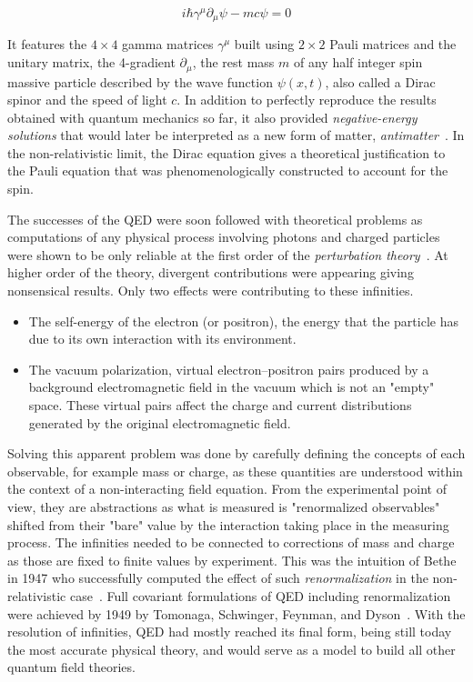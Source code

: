 	\begin{equation}
		\label{eq:dirac}
		i\hbar \gamma^\mu\partial_\mu\psi - mc\psi = 0
	\end{equation}
	
	It features the $4 \times 4$ gamma matrices $\gamma^\mu$ built using $2 \times 2$ Pauli matrices and the unitary matrix, the 4-gradient $\partial_\mu$, the rest mass $m$ of any half integer spin massive particle described by the wave function $\psi(x,t)$, also called a Dirac spinor and the speed of light $c$. In addition to perfectly reproduce the results obtained with quantum mechanics so far, it also provided \textit{negative-energy solutions} that would later be interpreted as a new form of matter, \textit{antimatter}~\cite{OPPENHEIMER1930I,DIRAC1931}. In the non-relativistic limit, the Dirac equation gives a theoretical justification to the Pauli equation that was phenomenologically constructed to account for the spin.
	
	The successes of the QED were soon followed with theoretical problems as computations of any physical process involving photons and charged particles were shown to be only reliable at the first order of the \textit{perturbation theory}~\cite{OPPENHEIMER1930II}. At higher order of the theory, divergent contributions were appearing giving nonsensical results. Only two effects were contributing to these infinities.
	
	\begin{itemize}
		\item The self-energy of the electron (or positron), the energy that the particle has due to its own interaction with its environment.
		\item The vacuum polarization, virtual electron–positron pairs produced by a background electromagnetic field in the vacuum which is not an "empty" space. These virtual pairs affect the charge and current distributions generated by the original electromagnetic field.
	\end{itemize}
	
	Solving this apparent problem was done by carefully defining the concepts of each observable, for example mass or charge, as these quantities are understood within the context of a non-interacting field equation. From the experimental point of view, they are abstractions as what is measured is "renormalized observables" shifted from their "bare" value by the interaction taking place in the measuring process. The infinities needed to be connected to corrections of mass and charge as those are fixed to finite values by experiment. This was the intuition of Bethe in 1947 who successfully computed the effect of such \textit{renormalization} in the non-relativistic case~\cite{BETHE1947}. Full covariant formulations of QED including renormalization were achieved by 1949 by Tomonaga, Schwinger, Feynman, and Dyson~\cite{DYSON1949}. With the resolution of infinities, QED had mostly reached its final form, being still today the most accurate physical theory, and would serve as a model to build all other quantum field theories.
	
